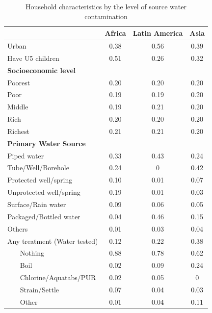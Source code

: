 \begin{table}[htbp]\centering
\def\sym#1{\ifmmode^{#1}\else\(^{#1}\)\fi}
\caption{Household characteristics by the level of source water contamination \label{Desc2}}
\begin{tabular}{l*{3}{c}}
\hline\hline
                    &\multicolumn{1}{c}{Africa}&\multicolumn{1}{c}{Latin America}&\multicolumn{1}{c}{Asia}\\

\hline
Urban               &        0.38&        0.56&        0.39\\
Have U5 children    &        0.51&        0.26&        0.32\\
\textbf{Socioeconomic level} \\\hline Poorest             &        0.20&        0.20&        0.20\\
Poor                &        0.19&        0.19&        0.20\\
Middle              &        0.19&        0.21&        0.20\\
Rich                &        0.20&        0.20&        0.20\\
Richest             &        0.21&        0.21&        0.20\\
\textbf{Primary Water Source} \\\hline Piped water         &        0.33&        0.43&        0.24\\
Tube/Well/Borehole  &        0.24&        0&        0.42\\
Protected well/spring&        0.10&        0.01&        0.07\\
Unprotected well/spring&        0.19&        0.01&        0.03\\
Surface/Rain water  &        0.09&        0.06&        0.05\\
Packaged/Bottled water&        0.04&        0.46&        0.15\\
Others              &        0.01&        0.03&        0.04\\
Any treatment (Water tested)&        0.12&        0.22&        0.38\\
~~~ Nothing      &        0.88&        0.78&        0.62\\
~~~ Boil         &        0.02&        0.09&        0.24\\
~~~ Chlorine/Aquatabs/PUR&        0.02&        0.05&        0\\
~~~ Strain/Settle&        0.07&        0.04&        0.03\\
~~~ Other        &        0.01&        0.04&        0.11\\

\end{tabular}
\end{table}
